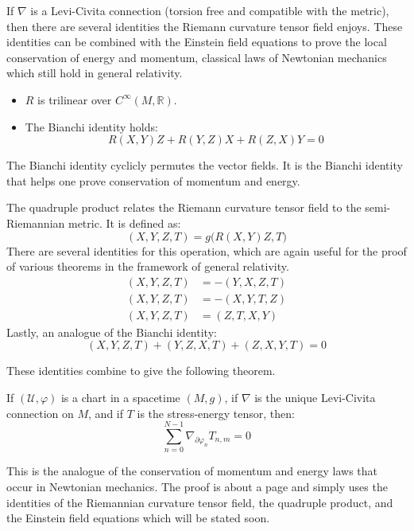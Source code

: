 \documentclass{beamer}
\begin{document}
    \begin{frame}
        If $\nabla$ is a Levi-Civita connection (torsion free and compatible
        with the metric), then there are several identities the Riemann
        curvature tensor field enjoys. These identities can be combined with
        the Einstein field equations to prove the local conservation of
        energy and momentum, classical laws of Newtonian mechanics which still
        hold in general relativity.
        \begin{itemize}
            \item $R$ is trilinear over $C^{\infty}(M,\mathbb{R})$.
            \item The Bianchi identity holds:
                \begin{equation}
                    R(X,Y)Z+R(Y,Z)X+R(Z,X)Y=0
                \end{equation}
        \end{itemize}
        The Bianchi identity cyclicly permutes the vector fields. It is the
        Bianchi identity that helps one prove conservation of momentum and
        energy.
    \end{frame}
    \begin{frame}
        The quadruple product relates the Riemann curvature tensor field to the
        semi-Riemannian metric. It is defined as:
        \begin{equation}
            (X,Y,Z,T)=g\big(R(X,Y)Z,T\big)
        \end{equation}
        There are several identities for this operation, which are again useful
        for the proof of various theorems in the framework of general
        relativity.
        \begin{align}
            (X,Y,Z,T)&=-(Y,X,Z,T)\\
            (X,Y,Z,T)&=-(X,Y,T,Z)\\
            (X,Y,Z,T)&=(Z,T,X,Y)
        \end{align}
        Lastly, an analogue of the Bianchi identity:
        \begin{equation}
            (X,Y,Z,T)+(Y,Z,X,T)+(Z,X,Y,T)=0
        \end{equation}
    \end{frame}
    \begin{frame}
        These identities combine to give the following theorem.
        \begin{theorem}
            If $(\mathcal{U},\varphi)$ is a chart in a spacetime $(M,g)$,
            if $\nabla$ is the unique Levi-Civita connection on $M$, and if
            $T$ is the stress-energy tensor, then:
            \begin{equation}
                \sum_{n=0}^{N-1}\nabla_{\partial\varphi_{n}}T_{n,m}=0
            \end{equation}
        \end{theorem}
        This is the analogue of the conservation of momentum and energy laws
        that occur in Newtonian mechanics. The proof is about a page and simply
        uses the identities of the Riemannian curvature tensor field, the
        quadruple product, and the Einstein field equations which will be
        stated soon.
    \end{frame}
\end{document}
